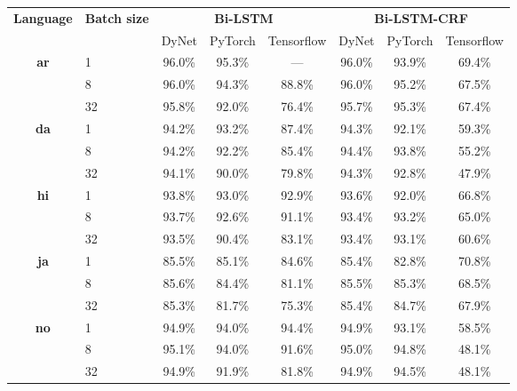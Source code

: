 \begin{table}[h!]
    \centering
    \begin{tabular}{c l c c c|c c c}
        \toprule
        \multirow{2}{*}{\bfseries Language} &
        \multirow{2}{*}{\bfseries Batch size} &
        \multicolumn{3}{c}{\bfseries Bi-LSTM} &
        \multicolumn{3}{c}{\bfseries Bi-LSTM-CRF} \\
        \cmidrule(lr){3-8}
        && DyNet & PyTorch & Tensorflow & DyNet & PyTorch & Tensorflow \\

        \cmidrule(lr){1-8}
        \multirow{3}{*}{\bfseries ar}
        &  1 & 96.0\% & 95.3\% &    --- & 96.0\% & 93.9\% & 69.4\% \\
        &  8 & 96.0\% & 94.3\% & 88.8\% & 96.0\% & 95.2\% & 67.5\% \\
        & 32 & 95.8\% & 92.0\% & 76.4\% & 95.7\% & 95.3\% & 67.4\% \\

        \cmidrule(lr){1-8}
        \multirow{3}{*}{\bfseries da}
        &  1 & 94.2\% & 93.2\% & 87.4\% & 94.3\% & 92.1\% & 59.3\% \\
        &  8 & 94.2\% & 92.2\% & 85.4\% & 94.4\% & 93.8\% & 55.2\% \\
        & 32 & 94.1\% & 90.0\% & 79.8\% & 94.3\% & 92.8\% & 47.9\% \\

        \cmidrule(lr){1-8}
        \multirow{3}{*}{\bfseries hi}
        &  1 & 93.8\% & 93.0\% & 92.9\% & 93.6\% & 92.0\% & 66.8\% \\
        &  8 & 93.7\% & 92.6\% & 91.1\% & 93.4\% & 93.2\% & 65.0\% \\
        & 32 & 93.5\% & 90.4\% & 83.1\% & 93.4\% & 93.1\% & 60.6\% \\

        \cmidrule(lr){1-8}
        \multirow{3}{*}{\bfseries ja}
        &  1 & 85.5\% & 85.1\% & 84.6\% & 85.4\% & 82.8\% & 70.8\% \\
        &  8 & 85.6\% & 84.4\% & 81.1\% & 85.5\% & 85.3\% & 68.5\% \\
        & 32 & 85.3\% & 81.7\% & 75.3\% & 85.4\% & 84.7\% & 67.9\% \\

        \cmidrule(lr){1-8}
        \multirow{3}{*}{\bfseries no}
        &  1 & 94.9\% & 94.0\% & 94.4\% & 94.9\% & 93.1\% & 58.5\% \\
        &  8 & 95.1\% & 94.0\% & 91.6\% & 95.0\% & 94.8\% & 48.1\% \\
        & 32 & 94.9\% & 91.9\% & 81.8\% & 94.9\% & 94.5\% & 48.1\% \\


\end{tabular}
\end{table}
